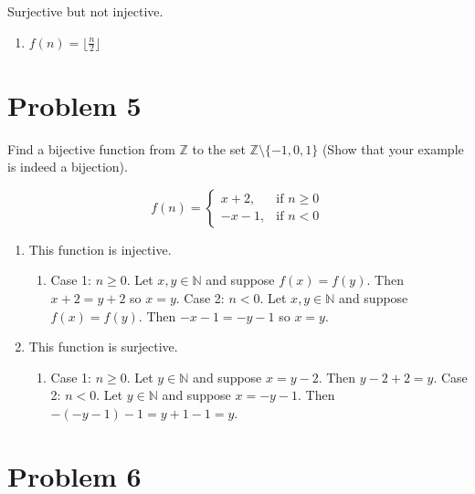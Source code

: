 \documentclass{article}
\begin{document}
    Surjective but not injective.

    \begin{enumerate}[label=\quad\quad, leftmargin=*]
        \item $f(n) = \lfloor \frac{n}{2} \rfloor$
    \end{enumerate}

    \section*{Problem 5}

    Find a bijective function from $\mathbb{Z}$ to the set $\mathbb{Z}\setminus\{-1,0,1\}$
    (Show that your example is indeed a bijection).

    \[
        f(n) = 
        \begin{cases}
            x + 2, & \text{if } n\geq 0 \\
            -x - 1, & \text{if } n < 0
        \end{cases}
    \]

    \begin{enumerate}[label=\quad\quad, leftmargin=*]
        \item 
        This function is injective.
        \begin{enumerate}[label=\quad\quad, leftmargin=*]
            \item
            Case 1: $n\geq 0$. Let $x,y\in\mathbb{N}$ and suppose $f(x)=f(y)$. Then 
            $x+2=y+2$ so $x=y$.
            Case 2: $n<0$. Let $x,y\in\mathbb{N}$ and suppose $f(x)=f(y)$. Then 
            $-x-1 = -y-1$ so $x=y$.
        \end{enumerate}
        \item
        This function is surjective.
        \begin{enumerate}[label=\quad\quad, leftmargin=*]
            \item
            Case 1: $n\geq 0$. Let $y\in\mathbb{N}$ and suppose $x=y-2$. Then 
            $y-2+2=y$.
            Case 2: $n<0$. Let $y\in\mathbb{N}$ and suppose $x=-y-1$. Then 
            $-(-y-1)-1=y+1-1=y$.
        \end{enumerate}
    \end{enumerate}



    \section*{Problem 6}
\end{document}
